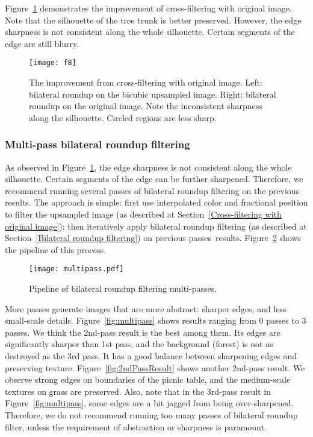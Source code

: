 Figure~\ref{compBRupOnOrig} demonstrates the improvement of cross-filtering with original image. Note that the silhouette of the tree trunk is better preserved. However, the edge sharpness is not consistent along the whole silhouette. Certain segments of the edge are still blurry.

\begin{figure}\centering
\texttt{[image: f8]}
\caption{The improvement from cross-filtering with original image. Left: bilateral roundup on the bicubic upsampled image. Right: bilateral roundup on the original image. Note the inconsistent sharpness along the silhouette. Circled regions are less sharp.}
\label{compBRupOnOrig}
\end{figure}

\subsubsection{Multi-pass bilateral roundup filtering }\label{sec:multipass}
As observed in Figure~\ref{compBRupOnOrig}, the edge sharpness is not consistent along the whole silhouette. Certain segments of the edge can be further sharpened. Therefore, we recommend running several  passes of bilateral roundup filtering on the previous results. The approach is simple: first use interpolated color and fractional position to filter the upsampled image (as described at Section~\ref{Cross-filtering with original image}); then iteratively apply bilateral roundup filtering (as described at Section~\ref{Bilateral roundup filtering}) on previous passes\textquotesingle ~results. Figure~\ref{fig:multi-pass pipeline} shows the pipeline of this process.

\begin{figure}[htbp]
\texttt{[image: multipass.pdf]}
\caption{Pipeline of bilateral roundup filtering multi-passes. }
\label{fig:multi-pass pipeline}
\end{figure}

More passes generate images that are more abstract: sharper edges, and less small-scale details.  Figure~\ref{fig:multipass} shows results ranging from 0 passes to 3 passes. We think the 2nd-pass result is the best among them. Its edges are significantly sharper than 1st pass, and the background (forest) is not as destroyed as the 3rd pass. It has a good balance between sharpening edges and preserving texture. Figure~\ref{fig:2ndPassResult} shows another 2nd-pass result. We observe strong edges on boundaries of the picnic table, and the medium-scale textures on grass are preserved. Also, note that in the 3rd-pass result in Figure~\ref{fig:multipass}, some edges are a bit jagged from being over-sharpened. Therefore, we do not recommend running too many passes of bilateral roundup filter, unless the requirement of abstraction or sharpness is paramount. 

